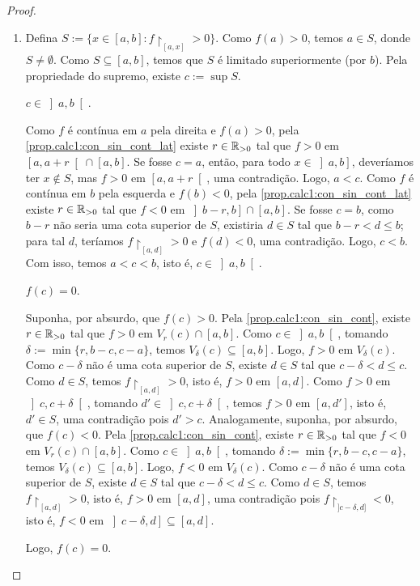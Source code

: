 \begin{proof}
\begin{enumerate}[leftmargin=*, align=left, label=\textbf{(\alph*)}]
\begin{midproof}
            \end{midproof}
        Logo, $f(c) = 0$. \blackproof
                \item Defina $S := \{x \in [a,b] : f \restriction_{[a,x]} > 0\}$. Como $f(a) > 0$, temos $a \in S$, donde $S \neq \emptyset$. Como $S \subseteq [a,b]$, temos que $S$ é limitado superiormente (por $b$). Pela propriedade do supremo, existe $c := \sup S$.
            \begin{claim}
                $c \in \left]a,b \right[$.
            \end{claim}
            \begin{midproof}
                Como $f$ é contínua em $a$ pela direita e $f(a) > 0$, pela \cref{prop.calc1:con_sin_cont_lat} existe $r \in \mathbb{R}_{>0}$ tal que $f > 0$ em $\left[a, a+r \right[ \cap [a,b]$. Se fosse $c=a$, então, para todo $x \in \left]a,b \right]$, deveríamos ter $x \notin S$, mas $f > 0$ em $\left[a,a+r\right[$, uma contradição. Logo, $a < c$. Como $f$ é contínua em $b$ pela esquerda e $f(b) < 0$, pela \cref{prop.calc1:con_sin_cont_lat} existe $r \in \mathbb{R}_{>0}$ tal que $f < 0$ em $\left]b-r, b \right] \cap [a,b]$. Se fosse $c=b$, como $b-r$ não seria uma cota superior de $S$, existiria $d \in S$ tal que $b-r < d \leq b$; para tal $d$, teríamos $f \restriction_{[a,d]} > 0$ e $f(d) < 0$, uma contradição. Logo, $c < b$. Com isso, temos $a<c<b$, isto é, $c \in \left] a,b \right[$. \whiteproof
            \end{midproof}
            \begin{claim}
                $f(c) = 0$.
            \end{claim}
            \begin{midproof}
                Suponha, por absurdo, que $f(c) > 0$. Pela \cref{prop.calc1:con_sin_cont}, existe $r \in \mathbb{R}_{>0}$ tal que $f > 0$ em $V_{r}(c) \cap [a,b]$. Como $c \in \left]a,b \right[$, tomando $\delta := \min \{r, b-c, c-a\}$, temos $V_{\delta}(c) \subseteq [a,b]$. Logo, $f>0$ em $V_{\delta}(c)$. Como $c-\delta$ não é uma cota superior de $S$, existe $d \in S$ tal que $c-\delta< d \leq c$. Como $d \in S$, temos $f \restriction_{[a,d]} > 0$, isto é, $f > 0$ em $[a,d]$. Como $f > 0$ em $\left]c, c+\delta \right[$, tomando $d' \in \left]c, c+\delta \right[$, temos $f>0$ em $\left[a, d' \right]$, isto é, $d' \in S$, uma contradição pois $d' > c$. Analogamente, suponha, por absurdo, que $f(c) < 0$. Pela \cref{prop.calc1:con_sin_cont}, existe $r \in \mathbb{R}_{>0}$ tal que $f < 0$ em $V_{r}(c) \cap [a,b]$. Como $c \in \left]a,b \right[$, tomando $\delta := \min \{r, b-c, c-a\}$, temos $V_{\delta}(c) \subseteq [a,b]$. Logo, $f<0$ em $V_{\delta}(c)$. Como $c-\delta$ não é uma cota superior de $S$, existe $d \in S$ tal que $c-\delta< d \leq c$. Como $d \in S$, temos $f \restriction_{[a,d]} > 0$, isto é, $f > 0$ em $[a,d]$, uma contradição pois $f \restriction_{]c-\delta, d]} < 0$, isto é, $f < 0$ em $\left]c-\delta, d \right] \subseteq [a,d]$. \whiteproof
            \end{midproof}
        Logo, $f(c) = 0$. \blackproof
    \end{enumerate}
\end{proof}

